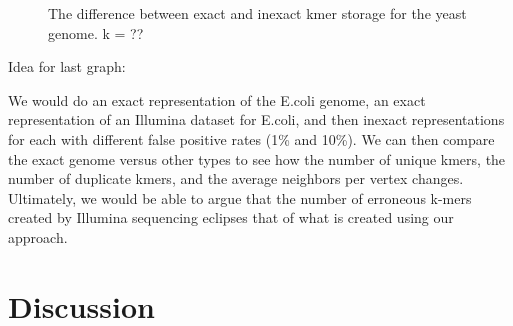 \documentclass[12pt]{article} \usepackage{simplemargins}
\begin{document}
\begin{figure}
\caption{The difference between exact and inexact kmer storage for the
yeast genome. k = ??}
\end{figure}

Idea for last graph:

We would do an exact representation of the E.coli genome, an exact 
representation of an Illumina dataset for E.coli, and then inexact
representations for each with different false positive rates (1\% and
10\%). We can then compare the exact genome versus other types to see
how the number of unique kmers, the number of duplicate kmers, and the
average neighbors per vertex changes. Ultimately, we would be able to
argue that the number of erroneous k-mers created by Illumina
sequencing eclipses that of what is created using our approach.

\section{Discussion}
\end{document}
